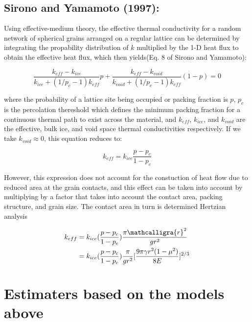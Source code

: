 \documentclass[11pt]{article} %
\newcommand{\sr}{\ensuremath{\mathcalligra{r}} \xspace}
\begin{document}
\subsection{Sirono and Yamamoto (1997):}

	Using effective-medium theory, the effective thermal conductivity for a random network of spherical grains arranged on a regular lattice can be determined by integrating the propability distribution of $k$ multiplied by the 1-D heat flux to obtain the effective heat flux, which then yields(Eq. 8 of Sirono and Yamamoto):
	
	 \begin{equation}
	 \frac{k_{eff} - k_{ice}}{k_{ice} +(1/p_{c}-1)k_{eff}}p + \frac{k_{eff}-k_{void}}{k_{void}+(1/p_{c}-1)k_{eff}}(1-p)=0
	 \end{equation}

	 where the probability of a lattice site being occupied or packing fraction is $p$, $p_{c}$  is the percolation thereshold which defines the minimum packing fraction for a continuous thermal path to exist across the material, and $k_{eff}$, $k_{ice}$, and $k_{void}$ are the effective, bulk ice, and void space thermal conductivities respectively. If we take $k_{void} \approx 0$, this equation reduces to:
	 
	 \begin{equation}
	 k_{eff} = k_{ice} \frac{p - p_{c}}{1 - p_{c}}
	 \end{equation}
	 
	 However, this expression does not account for the constuction of heat flow due to reduced area at the grain contacts, and this effect can be taken into account by multiplying by a factor that takes into account the contact area, packing structure, and grain size. The contact area in turn is determined Hertzian analysis
	 
		\begin{equation}
		\begin{split}
		k_{eff} &= k_{ice} ( \frac{p - p_{c}}{1-p_{c}} )\frac{\pi \sr^{2}}{g r^{2}} \\
			 &= k_{ice} ( \frac{p - p_{c}}{1-p_{c}} )\frac{\pi}{g r^{2}}[ \frac{9 \pi \gamma r^{2} (1-\mu^{2})}{8 E} ]^{2/3}
		\end{split}
		\end{equation}
	
	
\section{Estimaters based on the models above}
	
\end{document}

